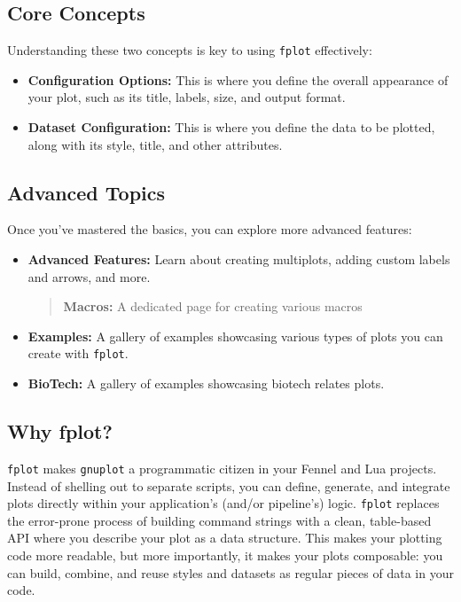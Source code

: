 \documentclass[12pt, letterpaper]{article}
\begin{document}
	\subsection*{Core Concepts}
	
	Understanding these two concepts is key to using \texttt{fplot} effectively:
	
	\begin{itemize}
		\item \textbf{Configuration Options:} This is where you define the overall appearance of your plot, such as its title, labels, size, and output format.
		\item \textbf{Dataset Configuration:} This is where you define the data to be plotted, along with its style, title, and other attributes.
	\end{itemize}
	
	\subsection*{Advanced Topics}
	
	Once you've mastered the basics, you can explore more advanced features:
	
	\begin{itemize}
		\item \textbf{Advanced Features:} Learn about creating multiplots, adding custom labels and arrows, and more.
		\begin{quote}
			\textbf{Macros:} A dedicated page for creating various macros
		\end{quote}
		\item \textbf{Examples:} A gallery of examples showcasing various types of plots you can create with \texttt{fplot}.
		\item \textbf{BioTech:} A gallery of examples showcasing biotech relates plots.
	\end{itemize}
	
	\subsection*{Why fplot?}
	
	\texttt{fplot} makes \texttt{gnuplot} a programmatic citizen in your Fennel and Lua projects. Instead of shelling out to separate scripts, you can define, generate, and integrate plots directly within your application's (and/or pipeline's) logic. \texttt{fplot} replaces the error-prone process of building command strings with a clean, table-based API where you describe your plot as a data structure. This makes your plotting code more readable, but more importantly, it makes your plots composable: you can build, combine, and reuse styles and datasets as regular pieces of data in your code.
	
\end{document}
